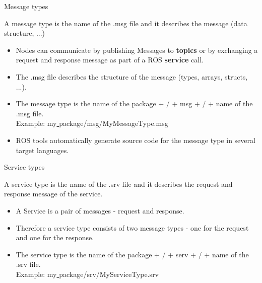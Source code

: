 \documentclass{beamer}
\begin{document}
\begin{frame}{Message types}	
	
	\begin{definition}
		A message type is the name of the .msg file and it describes the message (data structure, ...) 
	\end{definition}
		
	\begin{itemize}
		\item Nodes can communicate by publishing Messages to \textbf{topics} or by exchanging a request and response message as part of a ROS \textbf{service} call. \\
		
		\item The .msg file describes the structure of the message (types, arrays, structs, ...). \\
		
		\item The message type is the name of the package + / + msg + / + name of the .msg file. \\
		Example: my\underline{ }package/msg/MyMessageType.msg \\
		
		\item ROS tools automatically generate source code for the message type in several target languages.		
	\end{itemize}

	
\end{frame}


\begin{frame}{Service types}
	
	\begin{definition}
		A service type is the name of the .srv file and it describes the request and response message of the service.
	\end{definition}	
	
	\begin{itemize}
		\item A Service is a pair of messages - request and response. 
		\item Therefore a service type consists of two message types - one for the request and one for the response. 
		\item The service type is the name of the package + / + serv + / + name of the .srv file. \\
		Example: my\underline{ }package/srv/MyServiceType.srv \\
	\end{itemize}
		
\end{frame}
\end{document}
